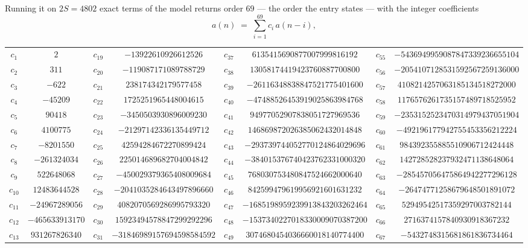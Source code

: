 \documentclass[11pt,a4paper]{article}
\theoremstyle{plain}
\theoremstyle{definition}
\begin{document}
Running it on $2S=4802$ exact terms of the model returns order $69$ --- the order the
entry states --- with the integer coefficients
\[
a(n)\;=\;\sum_{i=1}^{69}c_i\,a(n-i),
\]
\begin{center}\small
\begin{tabular}{cccccccc}
$c_{1}$ & $2$ & $c_{19}$ & $-13922610926612526$ & $c_{37}$ & $6135415690877007999816192$ & $c_{55}$ & $-5436949959087847339236655104$ \\
$c_{2}$ & $311$ & $c_{20}$ & $-119087171089788729$ & $c_{38}$ & $13058174419423760887700800$ & $c_{56}$ & $-2054107128531592567259136000$ \\
$c_{3}$ & $-622$ & $c_{21}$ & $238174342179577458$ & $c_{39}$ & $-26116348838847521775401600$ & $c_{57}$ & $4108214257063185134518272000$ \\
$c_{4}$ & $-45209$ & $c_{22}$ & $1725251965448004615$ & $c_{40}$ & $-47488526453919025863984768$ & $c_{58}$ & $1176576261735157489718525952$ \\
$c_{5}$ & $90418$ & $c_{23}$ & $-3450503930896009230$ & $c_{41}$ & $94977052907838051727969536$ & $c_{59}$ & $-2353152523470314979437051904$ \\
$c_{6}$ & $4100775$ & $c_{24}$ & $-21297142336135449712$ & $c_{42}$ & $146869872026385062432014848$ & $c_{60}$ & $-492196177942755453356212224$ \\
$c_{7}$ & $-8201550$ & $c_{25}$ & $42594284672270899424$ & $c_{43}$ & $-293739744052770124864029696$ & $c_{61}$ & $984392355885510906712424448$ \\
$c_{8}$ & $-261324034$ & $c_{26}$ & $225014689682704004842$ & $c_{44}$ & $-384015376740423762331000320$ & $c_{62}$ & $142728528237932471138648064$ \\
$c_{9}$ & $522648068$ & $c_{27}$ & $-450029379365408009684$ & $c_{45}$ & $768030753480847524662000640$ & $c_{63}$ & $-285457056475864942277296128$ \\
$c_{10}$ & $12483644528$ & $c_{28}$ & $-2041035284643497896660$ & $c_{46}$ & $842599479619956921601631232$ & $c_{64}$ & $-26474771258679648501891072$ \\
$c_{11}$ & $-24967289056$ & $c_{29}$ & $4082070569286995793320$ & $c_{47}$ & $-1685198959239913843203262464$ & $c_{65}$ & $52949542517359297003782144$ \\
$c_{12}$ & $-465633913170$ & $c_{30}$ & $15923494578847299292296$ & $c_{48}$ & $-1537340227018330009070387200$ & $c_{66}$ & $2716374157840930918367232$ \\
$c_{13}$ & $931267826340$ & $c_{31}$ & $-31846989157694598584592$ & $c_{49}$ & $3074680454036660018140774400$ & $c_{67}$ & $-5432748315681861836734464$ \\

\end{tabular}
\end{center}
\end{document}
